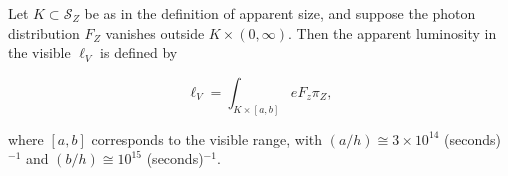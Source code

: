 Let $K \subset \mathcal{S}_Z$ be as in the definition of apparent size, and suppose the photon distribution $F_Z$ vanishes outside $K \times (0, \infty)$. Then the apparent luminosity in the visible $\ell_V$ is defined by

$$\ell_V = \int_{K \times [a, b]} eF_z \pi_Z,$$

where $[a, b]$ corresponds to the visible range, with $(a/h) \cong 3 \times 10^{14}$ (seconds)$^{-1}$ and $(b/h) \cong 10^{15}$ (seconds)$^{-1}$.
